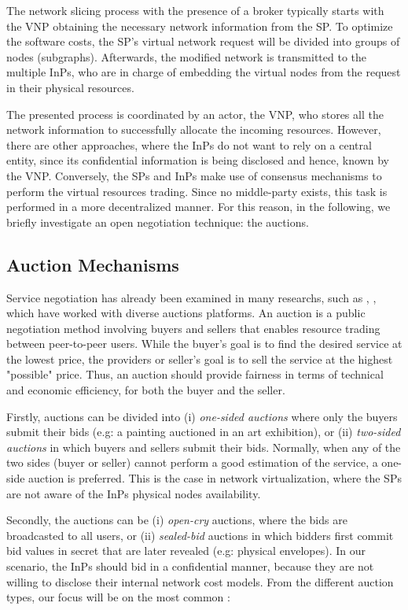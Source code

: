 The network slicing process with the presence of a broker typically starts with the VNP obtaining the necessary network information from the SP. To optimize the software costs, the SP's virtual network request will be divided into groups of nodes (subgraphs). Afterwards, the modified network is transmitted to the multiple InPs, who are in charge of embedding the virtual nodes from the request in their physical resources. 

The presented process is coordinated by an actor, the VNP, who stores all the network information to successfully allocate the incoming resources. However, there are other approaches, where the InPs do not want to rely on a central entity, since its confidential information is being disclosed and hence, known by the VNP. Conversely, the SPs and InPs make use of consensus mechanisms to perform the virtual resources trading. Since no middle-party exists, this task is performed in a more decentralized manner. For this reason, in the following, we briefly investigate an open negotiation technique: the auctions.

\subsection{Auction Mechanisms} \label{auctionMechanisms}

Service negotiation has already been examined in many researchs, such as \citep{hausheer2005peermart}, \cite{ogston2002peer}, which have worked with diverse auctions platforms. An auction is a public negotiation method involving buyers and sellers that enables resource trading between peer-to-peer users. While the buyer's goal is to find the desired service at the lowest price, the providers or seller's goal is to sell the service at the highest "possible" price. Thus, an auction should provide fairness in terms of technical and economic efficiency, for both the buyer and the seller.

Firstly, auctions can be divided into (i) \textit{one-sided auctions} where only the buyers submit their bids (e.g: a painting auctioned in an art exhibition), or (ii) \textit{two-sided auctions} in which buyers and sellers submit their bids. Normally, when any of the two sides (buyer or seller) cannot perform a good estimation of the service, a one-side auction is preferred. This is the case in network virtualization, where the SPs are not aware of the InPs physical nodes availability. 

Secondly, the auctions can be (i) \textit{open-cry} auctions, where the bids are broadcasted to all users, or (ii) \textit{sealed-bid} auctions in which bidders first commit bid values in secret that are later revealed (e.g: physical envelopes). In our scenario, the InPs should bid in a confidential manner, because they are not willing to disclose their internal network cost models. From the different auction types, our focus will be on the most common \cite{coppinger1980incentives}: 

